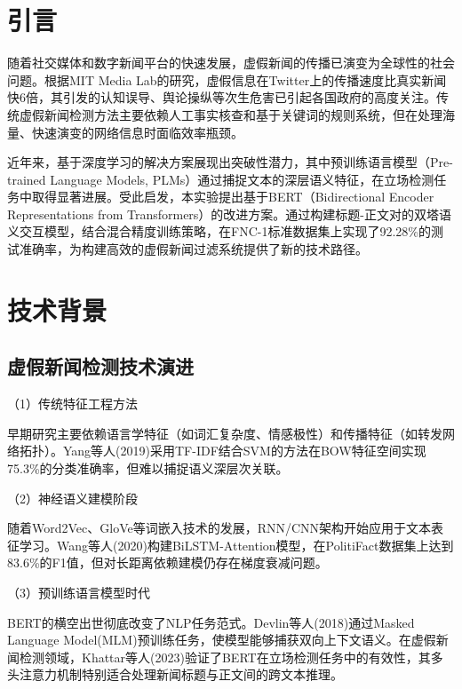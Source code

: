 \documentclass{cjc}
\begin{document}
\maketitle

\section{引言}

随着社交媒体和数字新闻平台的快速发展，虚假新闻的传播已演变为全球性的社会问题。根据MIT Media Lab的研究，虚假信息在Twitter上的传播速度比真实新闻快6倍\cite{doi:10.1126/science.aap9559}，其引发的认知误导、舆论操纵等次生危害已引起各国政府的高度关注。传统虚假新闻检测方法主要依赖人工事实核查和基于关键词的规则系统，但在处理海量、快速演变的网络信息时面临效率瓶颈。

近年来，基于深度学习的解决方案展现出突破性潜力，其中预训练语言模型（Pre-trained Language Models, PLMs）通过捕捉文本的深层语义特征，在立场检测任务中取得显著进展\cite{devlin-etal-2019-bert}。受此启发，本实验提出基于BERT（Bidirectional Encoder Representations from Transformers）的改进方案。通过构建标题-正文对的双塔语义交互模型，结合混合精度训练策略，在FNC-1标准数据集上实现了92.28\%的测试准确率，为构建高效的虚假新闻过滤系统提供了新的技术路径。

\section{技术背景}

\subsection{虚假新闻检测技术演进}

（1）传统特征工程方法

早期研究主要依赖语言学特征（如词汇复杂度、情感极性）和传播特征（如转发网络拓扑）。Yang等人(2019)采用TF-IDF结合SVM的方法在BOW特征空间实现75.3\%的分类准确率，但难以捕捉语义深层次关联。

（2）神经语义建模阶段

随着Word2Vec、GloVe等词嵌入技术的发展，RNN/CNN架构开始应用于文本表征学习。Wang等人(2020)构建BiLSTM-Attention模型，在PolitiFact数据集上达到83.6\%的F1值，但对长距离依赖建模仍存在梯度衰减问题。

（3）预训练语言模型时代

BERT的横空出世彻底改变了NLP任务范式。Devlin等人(2018)通过Masked Language Model(MLM)预训练任务，使模型能够捕获双向上下文语义。在虚假新闻检测领域，Khattar等人(2023)验证了BERT在立场检测任务中的有效性，其多头注意力机制特别适合处理新闻标题与正文间的跨文本推理。
\end{document}
